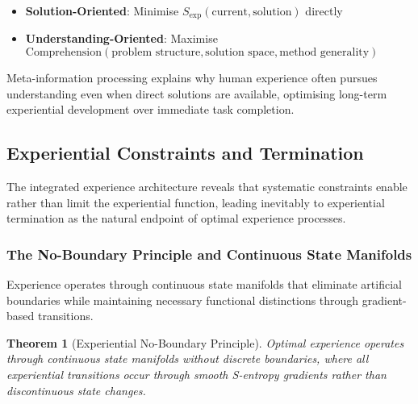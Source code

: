 \documentclass{article}
\newtheorem{theorem}{Theorem}[section]
\begin{document}
\begin{itemize}
\item \textbf{Solution-Oriented}: Minimise $S_{\text{exp}}(\text{current}, \text{solution})$ directly
\item \textbf{Understanding-Oriented}: Maximise $\text{Comprehension}(\text{problem structure}, \text{solution space}, \text{method generality})$
\end{itemize}

Meta-information processing explains why human experience often pursues understanding even when direct solutions are available, optimising long-term experiential development over immediate task completion.

\subsection{Experiential Constraints and Termination}

The integrated experience architecture reveals that systematic constraints enable rather than limit the experiential function, leading inevitably to experiential termination as the natural endpoint of optimal experience processes.

\subsubsection{The No-Boundary Principle and Continuous State Manifolds}

Experience operates through continuous state manifolds that eliminate artificial boundaries while maintaining necessary functional distinctions through gradient-based transitions.

\begin{theorem}[Experiential No-Boundary Principle]
\label{thm:experiential_no_boundary}
Optimal experience operates through continuous state manifolds without discrete boundaries, where all experiential transitions occur through smooth S-entropy gradients rather than discontinuous state changes.
\end{theorem}
\end{document}
